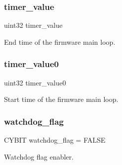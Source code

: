 \subsubsection{timer\+\_\+value}
{\footnotesize\ttfamily uint32 timer\+\_\+value}

End time of the firmware main loop. \mbox{\label{globals_8c_a9bab7f1b1cf2ba38d5968eee42644c32}} 
\subsubsection{timer\+\_\+value0}
{\footnotesize\ttfamily uint32 timer\+\_\+value0}

Start time of the firmware main loop. \mbox{\label{globals_8c_a156a860c465529ff2f515725ab816a58}} 
\subsubsection{watchdog\+\_\+flag}
{\footnotesize\ttfamily C\+Y\+B\+IT watchdog\+\_\+flag = F\+A\+L\+SE}

Watchdog flag enabler. 
